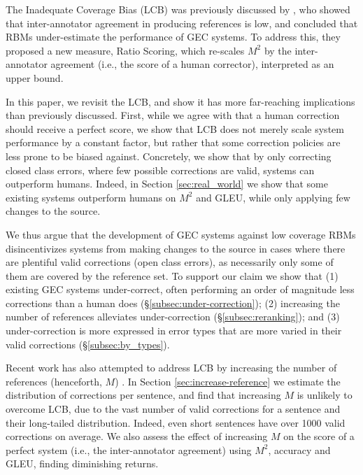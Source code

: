 \documentclass[11pt, a4paper]{article}
\begin{document}
  The Inadequate Coverage Bias (LCB) was previously discussed by \citet{bryant2015far}, 
  who showed that inter-annotator agreement in producing references is low, 
  and concluded that RBMs under-estimate the performance of GEC systems.
  To address this, they proposed a new measure, Ratio Scoring, which re-scales $M^2$ 
  by the inter-annotator agreement (i.e., the score of a human corrector), interpreted as an upper bound.

  In this paper, we revisit the LCB, and show it has more far-reaching implications than previously discussed. 
  First, while we agree with \citet{bryant2015far} that a human correction should receive a perfect score, 
  we show that LCB does not merely scale system performance by a constant factor, but
  rather that some correction policies are less prone to be biased against. 
  Concretely, we show that by only correcting closed class errors, where few possible corrections are valid, systems can outperform humans. 
  Indeed, in Section \ref{sec:real_world} we show that some existing systems outperform humans on $M^2$ and GLEU, while only applying few changes to the source.
  
  We thus argue that the development of GEC systems against low coverage RBMs disincentivizes systems from making changes to the source 
  in cases where there are plentiful valid corrections (open class errors), as necessarily only some of them are covered by the reference set. 
  To support our claim we show that (1) existing GEC systems under-correct, often performing an order of magnitude less corrections than a human does (\S\ref{subsec:under-correction});
  (2) increasing the number of references alleviates under-correction (\S\ref{subsec:reranking});
  and (3) under-correction is more expressed in error types that are more varied in their valid corrections (\S\ref{subsec:by_types}).
  
  Recent work has also attempted to address LCB by increasing the number of references 
  (henceforth, $M$) \cite{bryant2015far,sakaguchi2016reassessing}.
  In Section \ref{sec:increase-reference} we estimate the distribution of corrections per sentence, 
  and find that increasing $M$ is unlikely to overcome LCB, due
  to the vast number of valid corrections for a sentence and their long-tailed distribution.
  Indeed, even short sentences have over 1000 valid corrections on average. 
  We also assess the effect of increasing $M$ on 
  the score of a perfect system (i.e., the inter-annotator agreement) 
  using $M^2$, accuracy and GLEU, finding diminishing returns. 
\end{document}
